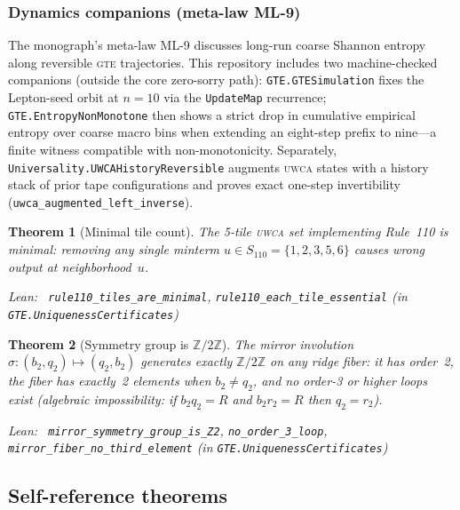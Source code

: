 \documentclass[11pt,a4paper]{article}
\newenvironment{leanref}%
  {\par\smallskip\noindent\begingroup\raggedright\textup{Lean:}~}%
  {\par\endgroup}
\newtheorem{theorem}{Theorem}[section]
\theoremstyle{definition}
\newcommand{\gte}{\textsc{gte}}
\newcommand{\uwca}{\textsc{uwca}}
\begin{document}
\subsubsection{Dynamics companions (meta-law ML-9)}

The monograph's meta-law ML-9 discusses long-run coarse Shannon entropy along reversible \gte{} trajectories.
This repository includes two machine-checked companions (outside the core zero-sorry path):
\texttt{GTE.GTESimulation} fixes the Lepton-seed orbit at $n=10$ via the
\texttt{UpdateMap} recurrence; \texttt{GTE.EntropyNonMonotone} then shows a strict drop in
cumulative empirical entropy over coarse macro bins when extending an eight-step prefix to
nine---a finite witness compatible with non-monotonicity.
Separately, \texttt{Universality.UWCAHistoryReversible} augments \uwca{} states with a history
stack of prior tape configurations and proves exact one-step invertibility
(\lstinline|uwca_augmented_left_inverse|).

\begin{theorem}[Minimal tile count]\label{thm:tiles-minimal}
The 5-tile \uwca{} set implementing Rule~110 is minimal: removing any single
minterm $u \in S_{110} = \{1,2,3,5,6\}$ causes wrong output at neighborhood~$u$.

\begin{leanref} \lstinline|rule110_tiles_are_minimal|,
\lstinline|rule110_each_tile_essential|
\textup{(in \texttt{GTE.UniquenessCertificates})}
\end{leanref}
\end{theorem}

\begin{theorem}[Symmetry group is $\mathbb{Z}/2\mathbb{Z}$]\label{thm:z2-symmetry}
The mirror involution $\sigma:(b_2,q_2)\mapsto(q_2,b_2)$ generates exactly
$\mathbb{Z}/2\mathbb{Z}$ on any ridge fiber: it has order~2, the fiber has
exactly~2 elements when $b_2\ne q_2$, and no order-3 or higher loops exist
(algebraic impossibility: if $b_2 q_2 = R$ and $b_2 r_2 = R$ then $q_2 = r_2$).

\begin{leanref} \lstinline|mirror_symmetry_group_is_Z2|,
\lstinline|no_order_3_loop|,
\lstinline|mirror_fiber_no_third_element|
\textup{(in \texttt{GTE.UniquenessCertificates})}
\end{leanref}
\end{theorem}

\subsection{Self-reference theorems}
\end{document}
